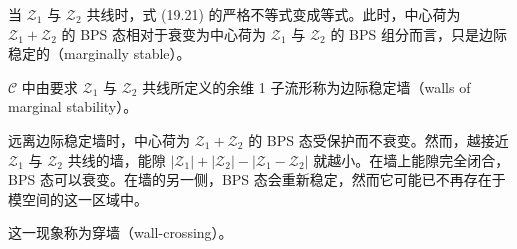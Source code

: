 \begin{remark}[19.35]
当 $\mathcal{Z}_1$ 与 $\mathcal{Z}_2$ 共线时，式 (19.21) 的严格不等式变成等式。此时，中心荷为 $\mathcal{Z}_1+\mathcal{Z}_2$ 的 BPS 态相对于衰变为中心荷为 $\mathcal{Z}_1$ 与 $\mathcal{Z}_2$ 的 BPS 组分而言，只是边际稳定的（marginally stable）。
\end{remark}

\begin{definition}[19.36]
$\mathcal{C}$ 中由要求 $\mathcal{Z}_1$ 与 $\mathcal{Z}_2$ 共线所定义的余维 1 子流形称为边际稳定墙（walls of marginal stability）。
\end{definition}

远离边际稳定墙时，中心荷为 $\mathcal{Z}_1+\mathcal{Z}_2$ 的 BPS 态受保护而不衰变。然而，越接近 $\mathcal{Z}_1$ 与 $\mathcal{Z}_2$ 共线的墙，能隙 $|\mathcal{Z}_1|+|\mathcal{Z}_2|-|\mathcal{Z}_1-\mathcal{Z}_2|$ 就越小。在墙上能隙完全闭合，BPS 态可以衰变。在墙的另一侧，BPS 态会重新稳定，然而它可能已不再存在于模空间的这一区域中。

\begin{definition}[19.37]
这一现象称为穿墙（wall-crossing）。
\end{definition}
